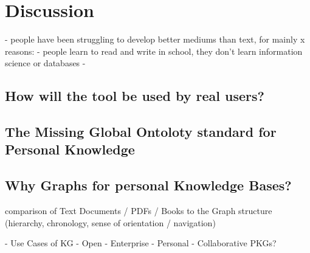 \chapter{Discussion}

- people have been struggling to develop better mediums than text, for mainly x reasons:
    - people learn to read and write in school, they don’t learn information science or databases
    - 

\section{How will the tool be used by real users?}

\section{The Missing Global Ontoloty standard for Personal Knowledge}

\section{Why Graphs for personal Knowledge Bases?}

comparison of Text Documents / PDFs / Books to the Graph structure (hierarchy, chronology, sense of orientation / navigation)

- Use Cases of KG
    - Open
    - Enterprise
    - Personal
    - Collaborative PKGs?